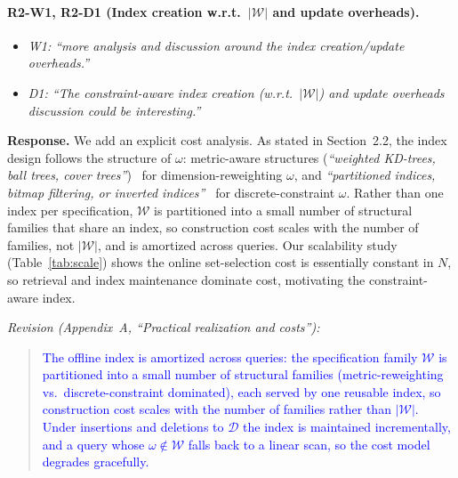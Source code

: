 \paragraph{R2-W1, R2-D1 (Index creation w.r.t.\ $|\mathcal{W}|$ and update overheads).}

\begin{itemize}[leftmargin=1.2em, itemsep=1pt, topsep=2pt]
\item \textit{W1: ``more analysis and discussion around the index creation/update overheads.''}
\item \textit{D1: ``The constraint-aware index creation (w.r.t.\ $|\mathcal{W}|$) and update overheads discussion could be interesting.''}
\end{itemize}
\smallskip

\noindent\textbf{Response.}
We add an explicit cost analysis. As stated in Section~2.2, the index design follows the structure of $\omega$: metric-aware structures (\emph{``weighted KD-trees, ball trees, cover trees''})~\cite{reif2022scalable} for dimension-reweighting $\omega$, and \emph{``partitioned indices, bitmap filtering, or inverted indices''}~\cite{lee2019constraint,chan1998bitmap,babenko2014inverted} for discrete-constraint $\omega$. Rather than one index per specification, $\mathcal{W}$ is partitioned into a small number of structural families that share an index, so construction cost scales with the number of families, not $|\mathcal{W}|$, and is amortized across queries. Our scalability study (Table~\ref{tab:scale}) shows the online set-selection cost is essentially constant in $N$, so retrieval and index maintenance dominate cost, motivating the constraint-aware index.

\noindent\emph{Revision (Appendix~A, ``Practical realization and costs''):}
\begin{quote}
\textcolor{blue}{The offline index is amortized across queries: the specification family $\mathcal W$ is partitioned into a small number of structural families (metric-reweighting vs.\ discrete-constraint dominated), each served by one reusable index, so construction cost scales with the number of families rather than $|\mathcal W|$. Under insertions and deletions to $\mathcal D$ the index is maintained incrementally, and a query whose $\omega\notin\mathcal W$ falls back to a linear scan, so the cost model degrades gracefully.}
\end{quote}
